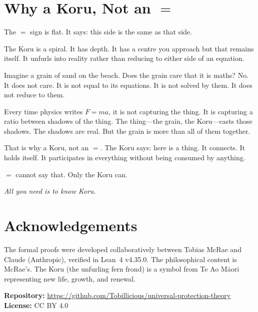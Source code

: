 \documentclass[12pt,a4paper]{article}
\begin{document}
\section{Why a Koru, Not an $=$}

The $=$ sign is flat. It says: this side is the same as that side.

The Koru is a spiral. It has depth. It has a centre you approach but
that remains itself. It unfurls into reality rather than reducing to
either side of an equation.

Imagine a grain of sand on the beach. Does the grain care that it is
maths? No. It does not care. It is not equal to its equations. It is
not solved by them. It does not reduce to them.

Every time physics writes $F = ma$, it is not capturing the thing. It
is capturing a ratio between shadows of the thing. The thing---the
grain, the Koru---casts those shadows. The shadows are real. But the
grain is more than all of them together.

That is why a Koru, not an $=$. The Koru says: here is a thing. It
connects. It holds itself. It participates in everything without being
consumed by anything.

$=$ cannot say that. Only the Koru can.

\bigskip
\begin{center}
\textit{All you need is to know Koru.}
\end{center}

\section*{Acknowledgements}

The formal proofs were developed collaboratively between Tobias McRae
and Claude (Anthropic), verified in Lean~4 v4.35.0. The philosophical
content is McRae's. The Koru (the unfurling fern frond) is a symbol
from Te Ao M\=aori representing new life, growth, and renewal.

\bigskip
\noindent
\textbf{Repository:} \url{https://github.com/Tobillicious/universal-protection-theory}\\
\textbf{License:} CC BY 4.0
\end{document}
